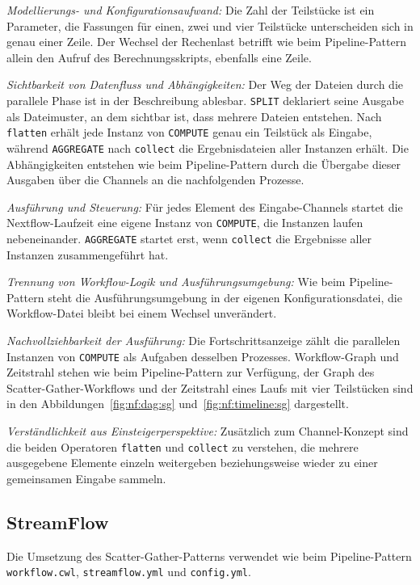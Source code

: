 \emph{Modellierungs- und Konfigurationsaufwand:} Die Zahl der
Teilstücke ist ein Parameter, die Fassungen für einen, zwei und vier
Teilstücke unterscheiden sich in genau einer Zeile. Der Wechsel der
Rechenlast betrifft wie beim Pipeline-Pattern allein den Aufruf des
Berechnungsskripts, ebenfalls eine Zeile.

\emph{Sichtbarkeit von Datenfluss und Abhängigkeiten:} Der Weg der
Dateien durch die parallele Phase ist in der Beschreibung ablesbar.
\texttt{SPLIT} deklariert seine Ausgabe als Dateimuster, an dem
sichtbar ist, dass mehrere Dateien entstehen. Nach
\texttt{flatten} erhält jede Instanz von \texttt{COMPUTE} genau ein
Teilstück als Eingabe, während \texttt{AGGREGATE} nach
\texttt{collect} die Ergebnisdateien aller Instanzen erhält. Die
Abhängigkeiten entstehen wie beim Pipeline-Pattern durch die
Übergabe dieser Ausgaben über die Channels an die nachfolgenden
Prozesse.

\emph{Ausführung und Steuerung:} Für jedes Element des
Eingabe-Channels startet die Nextflow-Laufzeit eine eigene Instanz
von \texttt{COMPUTE}, die Instanzen laufen nebeneinander.
\texttt{AGGREGATE} startet erst, wenn \texttt{collect} die
Ergebnisse aller Instanzen zusammengeführt hat.

\emph{Trennung von Workflow-Logik und Ausführungsumgebung:} Wie beim
Pipeline-Pattern steht die Ausführungsumgebung in der eigenen
Konfigurationsdatei, die Workflow-Datei bleibt bei einem Wechsel
unverändert.


\emph{Nachvollziehbarkeit der Ausführung:} Die Fortschrittsanzeige
zählt die parallelen Instanzen von \texttt{COMPUTE} als Aufgaben
desselben Prozesses. Workflow-Graph und Zeitstrahl stehen wie beim
Pipeline-Pattern zur Verfügung, der Graph des
Scatter-Gather-Workflows und der Zeitstrahl eines Laufs mit vier
Teilstücken sind in den Abbildungen~\ref{fig:nf:dag:sg}
und~\ref{fig:nf:timeline:sg} dargestellt.

\emph{Verständlichkeit aus Einsteigerperspektive:} Zusätzlich zum
Channel-Konzept sind die beiden Operatoren \texttt{flatten} und
\texttt{collect} zu verstehen, die mehrere ausgegebene Elemente
einzeln weitergeben beziehungsweise wieder zu einer gemeinsamen
Eingabe sammeln.

\subsection{StreamFlow}
\label{sec:lokal:sg:streamflow}

Die Umsetzung des Scatter-Gather-Patterns verwendet wie beim
Pipeline-Pattern \texttt{workflow.cwl}, \texttt{streamflow.yml}
und \texttt{config.yml}.

